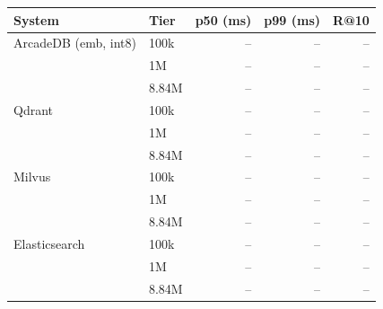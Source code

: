 \begin{tabular}{llrrr}
\toprule
System & Tier & p50 (ms) & p99 (ms) & R@10 \\
\midrule
ArcadeDB (emb, int8) & 100k & -- & -- & -- \\
 & 1M & -- & -- & -- \\
 & 8.84M & -- & -- & -- \\
\addlinespace
Qdrant & 100k & -- & -- & -- \\
 & 1M & -- & -- & -- \\
 & 8.84M & -- & -- & -- \\
\addlinespace
Milvus & 100k & -- & -- & -- \\
 & 1M & -- & -- & -- \\
 & 8.84M & -- & -- & -- \\
\addlinespace
Elasticsearch & 100k & -- & -- & -- \\
 & 1M & -- & -- & -- \\
 & 8.84M & -- & -- & -- \\
\bottomrule
\end{tabular}
